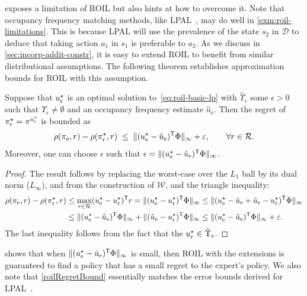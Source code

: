  exposes a limitation of ROIL but also hints at how to overcome it. Note that occupancy frequency matching methods, like LPAL~\cite{Syed2008}, may do well in \cref{exm:roil-limitations}. This is because LPAL will use the prevalence of the state $s_2$ in $\mathcal{D}$ to deduce that taking action $a_1$ in $s_1$ is preferable to $a_2$. As we discuss in \cref{sec:incorp-addit-constr}, it is easy to extend ROIL to benefit from similar distributional assumptions. The following theorem establishes approximation bounds for ROIL with this assumption. 
\begin{theorem} \label{roilRegretBound}
Suppose that $u_{\mathrm{r}}^{\star}$ is an optimal solution to~\eqref{eq:roil-basic-lp} with $\hat{\Upsilon}_{\epsilon}$ some $\epsilon>0$ such that $\hat{\Upsilon}_{\epsilon} \neq \emptyset$ and an occupancy frequency estimate $\hat{u}_{\mathrm{e}}$. Then the regret of $\pi_{\mathrm{r}}^{\star}  = \pi^{u^{\star}_{\mathrm{r}}}$ is bounded as
\[
 \rho(\pi_{\mathrm{e}}, r) - \rho(\pi_{\mathrm{r}}^{\star}, r)
\;\leq\;
\| (u_{\mathrm{e}}^{\star}  - \hat{u}_{\mathrm{e}})^{\mathsf{T}} \Phi \|_\infty + \varepsilon,
\qquad \forall r\in \mathcal{R}.
\]
Moreover, one can choose $\epsilon$ such that $ \epsilon = \| (u_{\mathrm{e}}^{\star}  - \hat{u}_{\mathrm{e}})^{\mathsf{T}} \Phi \|_\infty$.
\end{theorem}
\begin{proof}
The result follows by replacing the worst-case over the $L_1$ ball by its dual norm ($L_{\infty}$), and from the construction of $\mathcal{W}$, and the triangle inequality:
\begin{align*}
\rho(\pi_{\mathrm{e}}, r) - \rho(\pi_{\mathrm{r}}^{\star}, r)
  &\le  \max_{r\in\mathcal{R}} (u_{\mathrm{e}}^{\star}  - u_{\mathrm{r}}^{\star})^{\mathsf{T}} r
    = \| (u_{\mathrm{e}}^{\star}  - u_{\mathrm{r}}^{\star})^{\mathsf{T}} \Phi \|_\infty
    \leq \| (u_{\mathrm{e}}^{\star}  - \hat{u}_{\mathrm{e}} + \hat{u}_{\mathrm{e}} - u_{\mathrm{r}}^{\star})^{\mathsf{T}} \Phi \|_\infty \\
&\leq \| (u_{\mathrm{e}}^{\star} -\hat{u}_{\mathrm{e}})^{\mathsf{T}} \Phi \|_\infty + \| (\hat{u}_{\mathrm{e}} - u_{\mathrm{r}}^{\star})^{\mathsf{T}} \Phi \|_\infty \leq  \| (u_{\mathrm{e}}^{\star} -\hat{u}_{\mathrm{e}})^{\mathsf{T}} \Phi \|_\infty + \varepsilon.
\end{align*}
The last inequality follows from the fact that the $u_{\mathrm{r}}^{\star}  \in \hat{\Upsilon}_{\epsilon}$.
\end{proof}

 shows that when $\| (u_{\mathrm{e}}^{\star}  - \hat{u}_{\mathrm{e}})^{\mathsf{T}} \Phi \|_\infty $ is small, then ROIL with the extensions is guaranteed to find a policy that has a small regret to the expert's policy. We also note that \cref{roilRegretBound} essentially matches the error bounds derived for LPAL~\cite{Syed2008}.

